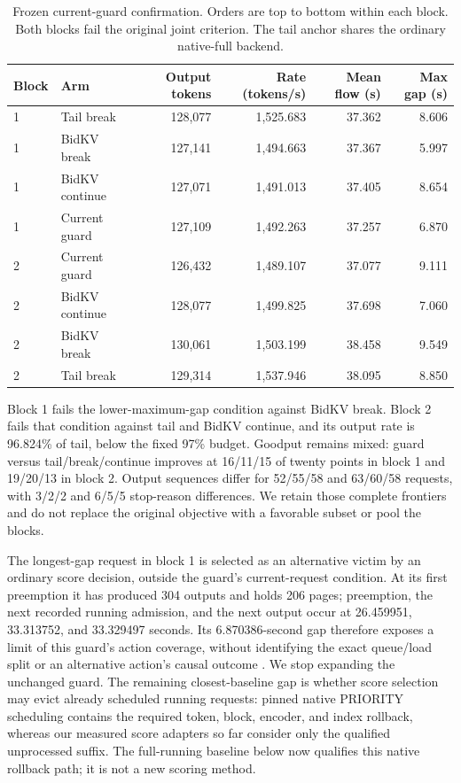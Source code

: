 \documentclass[10pt]{article}
\begin{document}
\begin{table}[t]
\centering\small
\caption{Frozen current-guard confirmation. Orders are top to bottom within each block. Both blocks fail the original joint criterion. The tail anchor shares the ordinary native-full backend.}
\label{tab:guardfresh}
\begin{tabular}{llrrrr}
\toprule
Block & Arm & Output tokens & Rate (tokens/s) & Mean flow (s) & Max gap (s) \\
\midrule
1 & Tail break & 128,077 & 1,525.683 & 37.362 & 8.606 \\
1 & BidKV break & 127,141 & 1,494.663 & 37.367 & 5.997 \\
1 & BidKV continue & 127,071 & 1,491.013 & 37.405 & 8.654 \\
1 & Current guard & 127,109 & 1,492.263 & 37.257 & 6.870 \\
\midrule
2 & Current guard & 126,432 & 1,489.107 & 37.077 & 9.111 \\
2 & BidKV continue & 128,077 & 1,499.825 & 37.698 & 7.060 \\
2 & BidKV break & 130,061 & 1,503.199 & 38.458 & 9.549 \\
2 & Tail break & 129,314 & 1,537.946 & 38.095 & 8.850 \\
\bottomrule
\end{tabular}
\end{table}

Block 1 fails the lower-maximum-gap condition against BidKV break. Block 2 fails that condition against tail and BidKV continue, and its output rate is 96.824\% of tail, below the fixed 97\% budget. Goodput remains mixed: guard versus tail/break/continue improves at 16/11/15 of twenty points in block 1 and 19/20/13 in block 2. Output sequences differ for 52/55/58 and 63/60/58 requests, with 3/2/2 and 6/5/5 stop-reason differences. We retain those complete frontiers and do not replace the original objective with a favorable subset or pool the blocks.

The longest-gap request in block 1 is selected as an alternative victim by an ordinary score decision, outside the guard's current-request condition. At its first preemption it has produced 304 outputs and holds 206 pages; preemption, the next recorded running admission, and the next output occur at 26.459951, 33.313752, and 33.329497 seconds. Its 6.870386-second gap therefore exposes a limit of this guard's action coverage, without identifying the exact queue/load split or an alternative action's causal outcome \cite{guardfreshchain}. We stop expanding the unchanged guard. The remaining closest-baseline gap is whether score selection may evict already scheduled running requests: pinned native PRIORITY scheduling contains the required token, block, encoder, and index rollback, whereas our measured score adapters so far consider only the qualified unprocessed suffix. The full-running baseline below now qualifies this native rollback path; it is not a new scoring method.
\end{document}
